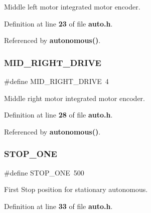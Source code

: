 Middle left motor integrated motor encoder. 



Definition at line \textbf{ 23} of file \textbf{ auto.\+h}.



Referenced by \textbf{ autonomous()}.

\mbox{\label{auto_8h_a2919b1b6b7bf06fab5b5bbf09d8d2761}} 
\subsubsection{M\+I\+D\+\_\+\+R\+I\+G\+H\+T\+\_\+\+D\+R\+I\+VE}
{\footnotesize\ttfamily \#define M\+I\+D\+\_\+\+R\+I\+G\+H\+T\+\_\+\+D\+R\+I\+VE~4}



Middle right motor integrated motor encoder. 



Definition at line \textbf{ 28} of file \textbf{ auto.\+h}.



Referenced by \textbf{ autonomous()}.

\mbox{\label{auto_8h_a67c9207ce99d4414dce28d8c42ba1d2a}} 
\subsubsection{S\+T\+O\+P\+\_\+\+O\+NE}
{\footnotesize\ttfamily \#define S\+T\+O\+P\+\_\+\+O\+NE~500}



First Stop position for stationary autonomous. 



Definition at line \textbf{ 33} of file \textbf{ auto.\+h}.

